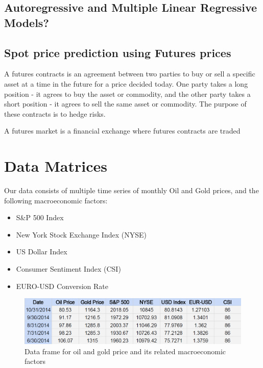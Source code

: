 \documentclass[runningheads]{llncs}
\begin{document}
\subsection{Autoregressive and Multiple Linear Regressive Models?}

\subsection{Spot price prediction using Futures prices}

A futures contracts is an agreement between two parties to buy or sell a specific asset at a time in the future for a price decided today. One party takes a long position - it agrees to buy the asset or commodity, and the other party takes a short position - it agrees to sell the same asset or commodity. The purpose of these contracts is to hedge risks.

A futures market is a financial exchange where futures contracts are traded

\newpage
\section{Data Matrices}
Our data consists of multiple time series of monthly Oil and Gold prices, and the following macroeconomic factors:

\begin {itemize}
\item S\&P 500 Index
\item New York Stock Exchange Index (NYSE)
\item US Dollar Index
\item Consumer Sentiment Index (CSI)
\item EURO-USD Conversion Rate
\end {itemize}
 
\begin{figure}
\centering
\includegraphics[width=\textwidth]{DataMatrices.png}
\caption{Data frame for oil and gold price and its related macroeconomic factors}
\label{fig:DataMatrices.png}
\end{figure}
\end{document}

